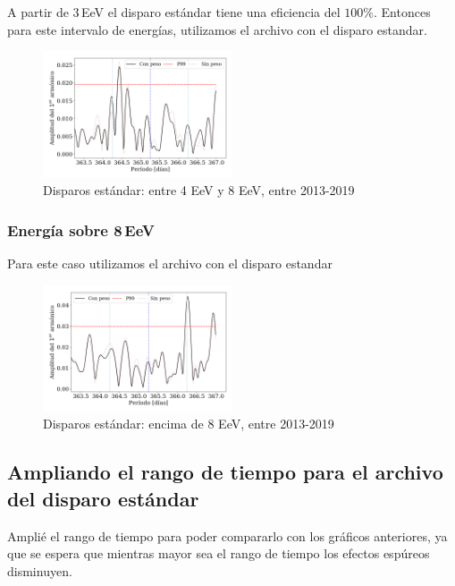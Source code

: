 A partir de $3\,$EeV el disparo estándar tiene una eficiencia del $100\%$. Entonces para este  intervalo de energías,  utilizamos el archivo con el disparo estandar.

\begin{figure}[H]
	\centering
	\includegraphics[width=0.5\textwidth]{Graficos/2019_Main_Array_4_8_EeV_con_vs_sin_peso.png}
	\caption{Disparos estándar: entre 4 EeV y 8 EeV, entre 2013-2019}
	\label{fig:48w}
\end{figure}

\subsubsection{Energía sobre 8\,EeV}

Para este caso utilizamos el archivo con el disparo estandar

\begin{figure}[H]
	\centering
	\includegraphics[width=0.5\textwidth]{Graficos/2019_Main_Array_8_EeV_con_vs_sin_peso.png}
	\caption{Disparos estándar: encima de 8 EeV, entre 2013-2019}
	\label{fig:8w}
\end{figure}




\subsection{Ampliando el rango de tiempo para el archivo del disparo estándar}

Amplié el rango de tiempo para poder compararlo con los gráficos anteriores, ya que se espera que mientras mayor sea el rango de tiempo los efectos espúreos disminuyen.

